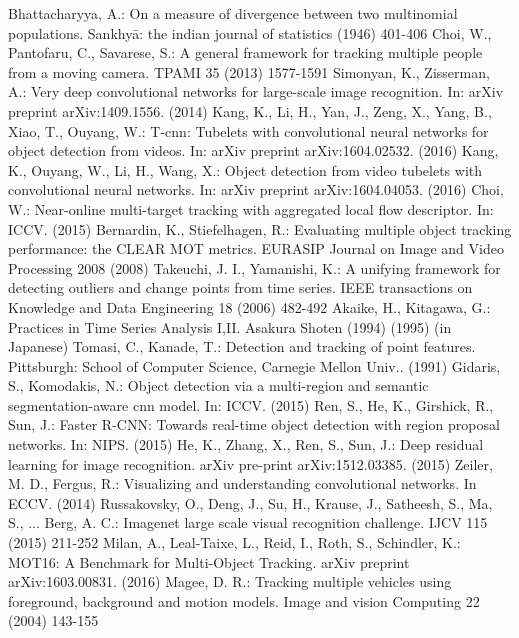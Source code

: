 \documentclass[runningheads]{llncs}
\begin{document}
\begin{thebibliography}{99}
Bhattacharyya, A.: On a measure of divergence between two multinomial populations. Sankhyā: the indian journal of statistics (1946) 401-406
Choi, W., Pantofaru, C., Savarese, S.: A general framework for tracking multiple people from a moving camera. TPAMI 35 (2013) 1577-1591
Simonyan, K., Zisserman, A.: Very deep convolutional networks for large-scale image recognition. In: arXiv preprint arXiv:1409.1556. (2014)
Kang, K., Li, H., Yan, J., Zeng, X., Yang, B., Xiao, T., Ouyang, W.: T-cnn: Tubelets with convolutional neural networks for object detection from videos. In: arXiv preprint arXiv:1604.02532. (2016)
Kang, K., Ouyang, W., Li, H., Wang, X.: Object detection from video tubelets with convolutional neural networks. In: arXiv preprint arXiv:1604.04053. (2016)
Choi, W.: Near-online multi-target tracking with aggregated local flow descriptor. In: ICCV. (2015)
Bernardin, K., Stiefelhagen, R.: Evaluating multiple object tracking performance: the CLEAR MOT metrics. EURASIP Journal on Image and Video Processing 2008 (2008)
Takeuchi, J. I., Yamanishi, K.: A unifying framework for detecting outliers and change points from time series. IEEE transactions on Knowledge and Data Engineering 18 (2006) 482-492
Akaike, H., Kitagawa, G.: Practices in Time Series Analysis I,II. Asakura Shoten (1994) (1995) (in Japanese)
Tomasi, C., Kanade, T.: Detection and tracking of point features. Pittsburgh: School of Computer Science, Carnegie Mellon Univ.. (1991)
Gidaris, S., Komodakis, N.: Object detection via a multi-region and semantic segmentation-aware cnn model. In: ICCV. (2015)
Ren, S., He, K., Girshick, R., Sun, J.: Faster R-CNN: Towards real-time object detection with region proposal networks. In: NIPS. (2015)
He, K., Zhang, X., Ren, S., Sun, J.: Deep residual learning for image recognition. arXiv pre-print arXiv:1512.03385. (2015)
Zeiler, M. D., Fergus, R.: Visualizing and understanding convolutional networks. In ECCV. (2014) 
Russakovsky, O., Deng, J., Su, H., Krause, J., Satheesh, S., Ma, S., ...  Berg, A. C.: Imagenet large scale visual recognition challenge. IJCV 115 (2015) 211-252
Milan, A., Leal-Taixe, L., Reid, I., Roth, S., Schindler, K.: MOT16: A Benchmark for Multi-Object Tracking. arXiv preprint arXiv:1603.00831. (2016)
Magee, D. R.: Tracking multiple vehicles using foreground, background and motion models. Image and vision Computing 22 (2004) 143-155

\end{thebibliography}
\end{document}
